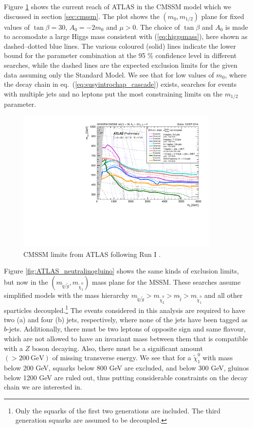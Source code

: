 \documentclass[twoside,english]{uiofysmaster}
\begin{document}
Figure \ref{fig:ATLAS_mSUGRA} shows the current reach of ATLAS in the CMSSM model which we discussed in section \ref{sec:cmssm}. The plot shows the $(m_0,m_{1/2})$ plane for fixed values of $\tan\beta = 30$, $A_0 = -2m_0$ and $\mu>0$. The choice of $\tan\beta$ and $A_0$ is made to accomodate a large Higgs mass consistent with (\ref{eq:higgsmass}), here shown as dashed--dotted blue lines. The various coloured (solid) lines indicate the lower bound for the parameter combination at the 95 \% confidence level in different searches, while the dashed lines are the expected exclusion limits for the given data assuming only the Standard Model. We see that for low values of $m_0$, where the decay chain in eq.~(\ref{eq:susyintrochap_cascade}) exists, searches for events with multiple jets and no leptons put the most constraining limits on the $m_{1/2}$ parameter.
\begin{figure}[hbt]
	\centering
	\includegraphics[width=0.9\textwidth]{figures/susyintro/ATLAS_SUSY_MSUGRA.pdf}
	\caption{CMSSM limits from ATLAS following Run I \cite{Aad:2014wea,Aad:2013wta,Aad:2014lra,TheATLAScollaboration:2013uha,Aad:2014mra,Aad:2014pda}.}
	\label{fig:ATLAS_mSUGRA}
\end{figure}

Figure \ref{fig:ATLAS_neutralinogluino} shows the same kinds of exclusion limits, but now in the $(m_{\tilde q/\tilde g}, m_{\tilde \chi_1^0})$ mass plane for the MSSM. These searches assume simplified models with the mass hierarchy $m_{\tilde q/\tilde g} > m_{\tilde \chi_2^0} > m_{\tilde l} > m_{\tilde \chi_1^0}$ and all other sparticles decoupled.\footnote{Only the squarks of the first two generations are included. The third generation squarks are assumed to be decoupled.} The events considered in this analysis are required to have two (a) and four (b) jets, respectively, where none of the jets have been tagged as $b$-jets. Additionally, there must be two leptons of opposite sign and same flavour, which are not allowed to have an invariant mass between them that is compatible with a $Z$ boson decaying. Also, there must be a significant amount $(> 200 ~\mathrm{GeV})$ of missing transverse energy. We see that for a $\tilde \chi_1^0$ with mass below 200 GeV, squarks below 800 GeV are excluded, and below 300 GeV, gluinos below 1200 GeV are ruled out, thus putting considerable constraints on the decay chain we are interested in.
\end{document}
